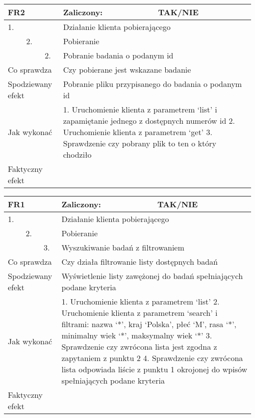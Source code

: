 \begin{tabular}{|p{20pt}|p{20pt}|p{20pt}|p{250pt}|p{60pt}|}
	\hline
	\multicolumn{3}{|p{70pt}|}{FR2} & Zaliczony: & TAK/NIE \\ \hline
	1. & & & \multicolumn{2}{|p{310pt}|}{Działanie klienta pobierającego } \\ \hline
	& 2. & & \multicolumn{2}{|p{310pt}|}{Pobieranie } \\ \hline
	& & 2. & \multicolumn{2}{|p{310pt}|}{Pobranie badania o podanym id } \\ \hline
	\multicolumn{3}{|p{70pt}|}{Co sprawdza} & \multicolumn{2}{|p{310pt}|}{Czy pobierane jest wskazane badanie} \\ \hline
	\multicolumn{3}{|p{70pt}|}{Spodziewany efekt} & \multicolumn{2}{|p{310pt}|}{Pobranie pliku przypisanego do badania o podanym id} \\ \hline
	\multicolumn{3}{|p{70pt}|}{Jak wykonać} & \multicolumn{2}{|p{310pt}|}{1. Uruchomienie klienta z parametrem ‘list’ i zapamiętanie jednego z dostępnych numerów id
2. Uruchomienie klienta z parametrem ‘get’
3. Sprawdzenie czy pobrany plik to ten o który chodziło} \\ \hline
	\multicolumn{3}{|p{70pt}|}{Faktyczny efekt} & \multicolumn{2}{|p{310pt}|}{} \\ \hline
\end{tabular}

\begin{tabular}{|p{20pt}|p{20pt}|p{20pt}|p{250pt}|p{60pt}|}
	\hline
	\multicolumn{3}{|p{70pt}|}{FR1} & Zaliczony: & TAK/NIE \\ \hline
	1. & & & \multicolumn{2}{|p{310pt}|}{Działanie klienta pobierającego } \\ \hline
	& 2. & & \multicolumn{2}{|p{310pt}|}{Pobieranie } \\ \hline
	& & 3. & \multicolumn{2}{|p{310pt}|}{Wyszukiwanie badań z filtrowaniem } \\ \hline
	\multicolumn{3}{|p{70pt}|}{Co sprawdza} & \multicolumn{2}{|p{310pt}|}{Czy działa filtrowanie listy dostępnych badań} \\ \hline
	\multicolumn{3}{|p{70pt}|}{Spodziewany efekt} & \multicolumn{2}{|p{310pt}|}{Wyświetlenie listy zawężonej do badań spełniających podane kryteria} \\ \hline
	\multicolumn{3}{|p{70pt}|}{Jak wykonać} & \multicolumn{2}{|p{310pt}|}{1. Uruchomienie klienta z parametrem ‘list’
2. Uruchomienie klienta z parametrem ‘search’ i filtrami: nazwa ‘*’, kraj ‘Polska’, płeć ‘M’, rasa ‘*’, minimalny wiek ‘*’, maksymalny wiek ‘*’
3. Sprawdzenie czy zwrócona lista jest zgodna z zapytaniem z punktu 2
4. Sprawdzenie czy zwrócona lista odpowiada liście z punktu 1 okrojonej do wpisów spełniających podane kryteria} \\ \hline
	\multicolumn{3}{|p{70pt}|}{Faktyczny efekt} & \multicolumn{2}{|p{310pt}|}{} \\ \hline
\end{tabular}

